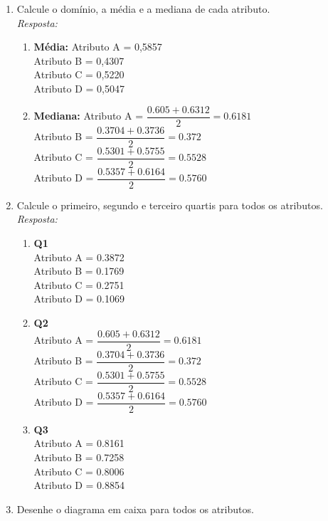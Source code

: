 \documentclass{article}
\begin{document}
\begin{enumerate}[label=\alph*]
  \item Calcule o domínio, a média e a mediana de cada atributo. \\
  \textit{Resposta:} 
    \begin{enumerate}[label=\alph*]
    \item \textbf{Média:} Atributo A = 0,5857 \\
      Atributo B = 0,4307 \\
      Atributo C = 0,5220 \\
      Atributo D = 0,5047
    \item \textbf{Mediana:} Atributo A = $\dfrac{0.605 + 0.6312}{2} = 0.6181$\\
    Atributo B = $\dfrac{0.3704 + 0.3736}{2} = 0.372$\\ 
    Atributo C = $\dfrac{0.5301 + 0.5755}{2} = 0.5528$\\ 
    Atributo D = $\dfrac{0.5357 + 0.6164}{2} = 0.5760$\\ 
    \end{enumerate}
  \item Calcule o primeiro, segundo e terceiro quartis para todos os atributos. \\
  \textit{Resposta:}
  \begin{enumerate}[label=\alph*]
    \item \textbf{Q1} \\
    Atributo A = 0.3872 \\
    Atributo B = 0.1769 \\
    Atributo C = 0.2751 \\
    Atributo D = 0.1069 
    \item \textbf{Q2} \\
    Atributo A = $\dfrac{0.605 + 0.6312}{2} = 0.6181$\\
    Atributo B = $\dfrac{0.3704 + 0.3736}{2} = 0.372$\\ 
    Atributo C = $\dfrac{0.5301 + 0.5755}{2} = 0.5528$\\ 
    Atributo D = $\dfrac{0.5357 + 0.6164}{2} = 0.5760$\\ 
    \item \textbf{Q3} \\
    Atributo A = 0.8161 \\
    Atributo B = 0.7258 \\
    Atributo C = 0.8006 \\
    Atributo D = 0.8854 
  \end{enumerate}
  \item  Desenhe o diagrama em caixa para todos os atributos. \\


\end{enumerate}
\end{document}
